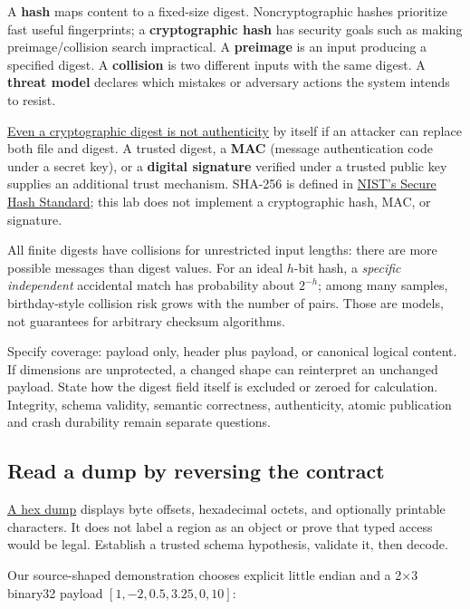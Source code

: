 A \textbf{hash} maps content to a fixed-size digest. Noncryptographic hashes prioritize fast useful fingerprints; a \textbf{cryptographic hash} has security goals such as making preimage/collision search impractical. A \textbf{preimage} is an input producing a specified digest. A \textbf{collision} is two different inputs with the same digest. A \textbf{threat model} declares which mistakes or adversary actions the system intends to resist.

\hyperref[appendix-cbe594d1ab0a]{Even a cryptographic digest is not authenticity} by itself if an attacker can replace both file and digest. A trusted digest, a \textbf{MAC} (message authentication code under a secret key), or a \textbf{digital signature} verified under a trusted public key supplies an additional trust mechanism. SHA-256 is defined in \href{https://csrc.nist.gov/pubs/fips/180-4/upd1/final}{NIST's Secure Hash Standard}; this lab does not implement a cryptographic hash, MAC, or signature.

All finite digests have collisions for unrestricted input lengths: there are more possible messages than digest values. For an ideal \(h\)-bit hash, a \emph{specific independent} accidental match has probability about \(2^{-h}\); among many samples, birthday-style collision risk grows with the number of pairs. Those are models, not guarantees for arbitrary checksum algorithms.

Specify coverage: payload only, header plus payload, or canonical logical content. If dimensions are unprotected, a changed shape can reinterpret an unchanged payload. State how the digest field itself is excluded or zeroed for calculation. Integrity, schema validity, semantic correctness, authenticity, atomic publication and crash durability remain separate questions.

\subsection{Read a dump by reversing the contract}\label{01-foundations-i-ch002-read-a-dump-by-reversing-the-contract}

\hyperref[appendix-230b59c0676b]{A hex dump} displays byte offsets, hexadecimal octets, and optionally printable characters. It does not label a region as an object or prove that typed access would be legal. Establish a trusted schema hypothesis, validate it, then decode.

Our source-shaped demonstration chooses explicit little endian and a 2×3 binary32 payload \([1,-2,0.5,3.25,0,10]\):

